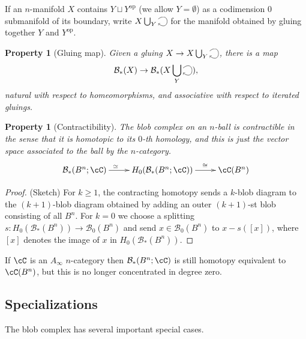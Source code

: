 \documentclass{pnastwo}
\def\bc{{\mathcal B}}
\newcommand{\iso}{\cong}
\newcommand{\htpy}{\simeq}
\newcommand{\tensor}{\otimes}
\newcommand{\selfarrow}{\ensuremath{\smash{\tikz[baseline]{\clip (0,0.36) rectangle (0.39,-0.16); \draw[->] (0,0.2) .. controls (0.5,0.6) and (0.5,-0.4) .. (0,0);}}}}
\newcommand{\bdy}{\partial}
\newcommand{\eset}{\emptyset}
\newtheorem{property}[prop]{Property}
\def\nn#1{{{\color[rgb]{.2,.5,.6} \small [[#1]]}}}
\begin{document}
\begin{article}
If an $n$-manifold $X$ contains $Y \sqcup Y^\text{op}$ (we allow $Y = \eset$) as a codimension $0$ submanifold of its boundary, 
write $X \bigcup_{Y}\selfarrow$ for the manifold obtained by gluing together $Y$ and $Y^\text{op}$.
\begin{property}[Gluing map]
\label{property:gluing-map}%
Given a gluing $X \to X \bigcup_{Y}\selfarrow$, there is
a map
\[
	\bc_*(X) \to \bc_*(X \bigcup_{Y}\selfarrow),
\]
natural with respect to homeomorphisms, and associative with respect to iterated gluings.
\end{property}

\begin{property}[Contractibility]
\label{property:contractibility}%
The blob complex on an $n$-ball is contractible in the sense 
that it is homotopic to its $0$-th homology, and this is just the vector space associated to the ball by the $n$-category.
\begin{equation*}
\xymatrix{\bc_*(B^n;\cC) \ar[r]^(0.4){\htpy} & H_0(\bc_*(B^n;\cC)) \ar[r]^(0.6)\iso & \cC(B^n)}
\end{equation*}
\end{property}

\begin{proof}(Sketch)
For $k\ge 1$, the contracting homotopy sends a $k$-blob diagram to the $(k{+}1)$-blob diagram
obtained by adding an outer $(k{+}1)$-st blob consisting of all $B^n$.
For $k=0$ we choose a splitting $s: H_0(\bc_*(B^n)) \to \bc_0(B^n)$ and send 
$x\in \bc_0(B^n)$ to $x - s([x])$, where $[x]$ denotes the image of $x$ in $H_0(\bc_*(B^n))$.
\end{proof}

If $\cC$ is an $A_\infty$ $n$-category then $\bc_*(B^n;\cC)$ is still homotopy equivalent to $\cC(B^n)$,
but this is no longer concentrated in degree zero.

\subsection{Specializations}
\label{sec:specializations}

The blob complex has several important special cases.


\end{article}
\end{document}
